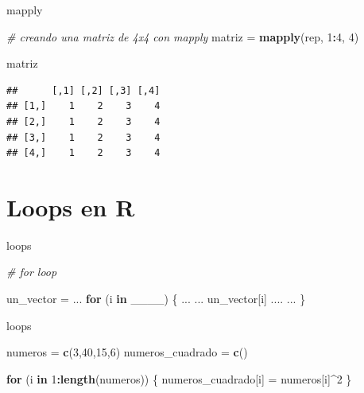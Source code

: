 \documentclass[ignorenonframetext,]{beamer}
\newenvironment{Shaded}{\begin{snugshade}}{\end{snugshade}}
\newcommand{\CommentTok}[1]{\textcolor[rgb]{0.56,0.35,0.01}{\textit{#1}}}
\newcommand{\ControlFlowTok}[1]{\textcolor[rgb]{0.13,0.29,0.53}{\textbf{#1}}}
\newcommand{\DecValTok}[1]{\textcolor[rgb]{0.00,0.00,0.81}{#1}}
\newcommand{\KeywordTok}[1]{\textcolor[rgb]{0.13,0.29,0.53}{\textbf{#1}}}
\newcommand{\NormalTok}[1]{#1}
\newcommand{\OperatorTok}[1]{\textcolor[rgb]{0.81,0.36,0.00}{\textbf{#1}}}
\newcommand{\StringTok}[1]{\textcolor[rgb]{0.31,0.60,0.02}{#1}}
\begin{document}
\begin{frame}[fragile]{mapply}
\protect\hypertarget{mapply}{}

\begin{Shaded}
\begin{Highlighting}[]
\CommentTok{# creando una matriz de 4x4 con mapply}
\NormalTok{matriz =}\StringTok{ }\KeywordTok{mapply}\NormalTok{(rep, }\DecValTok{1}\OperatorTok{:}\DecValTok{4}\NormalTok{, }\DecValTok{4}\NormalTok{)}

\NormalTok{matriz}
\end{Highlighting}
\end{Shaded}

\begin{verbatim}
##      [,1] [,2] [,3] [,4]
## [1,]    1    2    3    4
## [2,]    1    2    3    4
## [3,]    1    2    3    4
## [4,]    1    2    3    4
\end{verbatim}

\end{frame}

\hypertarget{loops-en-r}{%
\section{Loops en R}\label{loops-en-r}}

\begin{frame}[fragile]{loops}
\protect\hypertarget{loops}{}

\begin{Shaded}
\begin{Highlighting}[]
\CommentTok{# for loop}

\NormalTok{un_vector =}\StringTok{ }\NormalTok{...}
\ControlFlowTok{for}\NormalTok{ (i }\ControlFlowTok{in}\NormalTok{ ____) \{}
\NormalTok{  ...}
\NormalTok{  ... un_vector[i] ....}
\NormalTok{  ...}
\NormalTok{\}}
\end{Highlighting}
\end{Shaded}

\end{frame}

\begin{frame}[fragile]{loops}
\protect\hypertarget{loops-1}{}

\begin{Shaded}
\begin{Highlighting}[]
\NormalTok{numeros =}\StringTok{ }\KeywordTok{c}\NormalTok{(}\DecValTok{3}\NormalTok{,}\DecValTok{40}\NormalTok{,}\DecValTok{15}\NormalTok{,}\DecValTok{6}\NormalTok{)}
\NormalTok{numeros_cuadrado =}\StringTok{ }\KeywordTok{c}\NormalTok{()}

\ControlFlowTok{for}\NormalTok{ (i }\ControlFlowTok{in} \DecValTok{1}\OperatorTok{:}\KeywordTok{length}\NormalTok{(numeros)) \{}
\NormalTok{  numeros_cuadrado[i] =}\StringTok{ }\NormalTok{numeros[i]}\OperatorTok{^}\DecValTok{2}
\NormalTok{\}}
\end{Highlighting}
\end{Shaded}

\end{frame}
\end{document}
